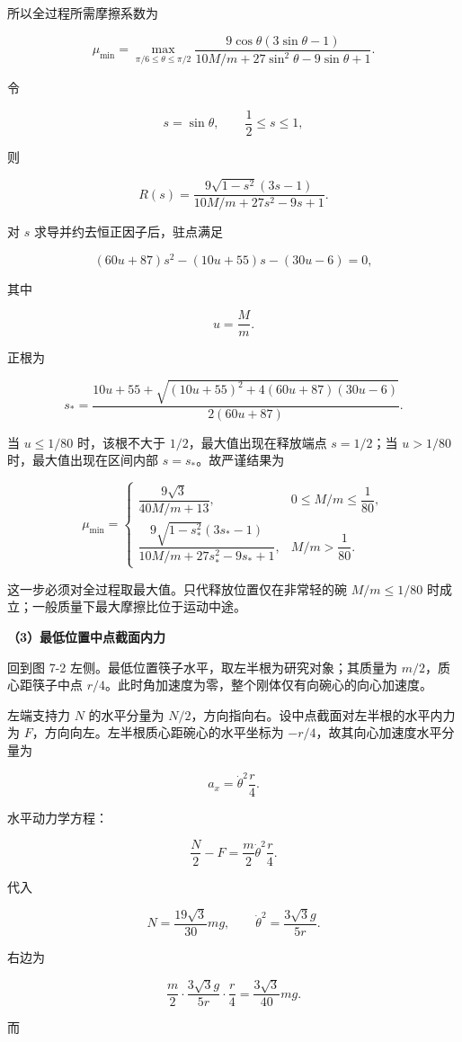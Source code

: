 \documentclass[12pt,a4paper,UTF8]{ctexart}
\begin{document}
所以全过程所需摩擦系数为

\[\mu_{\min}=\max_{\pi/6\le\theta\le\pi/2}
\frac{9\cos\theta(3\sin\theta-1)}
{10M/m+27\sin^2\theta-9\sin\theta+1}.\]

令

\[s=\sin\theta,\qquad \frac12\le s\le1,\]

则

\[R(s)=\frac{9\sqrt{1-s^2}(3s-1)}{10M/m+27s^2-9s+1}.\]

对 \(s\) 求导并约去恒正因子后，驻点满足

\[(60u+87)s^2-(10u+55)s-(30u-6)=0,\]

其中

\[u=\frac{M}{m}.\]

正根为

\[s_*=\frac{10u+55+\sqrt{(10u+55)^2+4(60u+87)(30u-6)}}{2(60u+87)}.\]

当 \(u\le1/80\) 时，该根不大于 \(1/2\)，最大值出现在释放端点
\(s=1/2\)；当 \(u>1/80\) 时，最大值出现在区间内部
\(s=s_*\)。故严谨结果为

\[\boxed{
\mu_{\min}=
\begin{cases}
\dfrac{9\sqrt3}{40M/m+13},&0\le M/m\le\dfrac1{80},\\[1.1em]
\dfrac{9\sqrt{1-s_*^2}(3s_*-1)}{10M/m+27s_*^2-9s_*+1},&M/m>\dfrac1{80}.
\end{cases}
}\]

这一步必须对全过程取最大值。只代释放位置仅在非常轻的碗 \(M/m\le1/80\)
时成立；一般质量下最大摩擦比位于运动中途。

\textbf{（3）最低位置中点截面内力}

回到图 7-2 左侧。最低位置筷子水平，取左半根为研究对象；其质量为
\(m/2\)，质心距筷子中点
\(r/4\)。此时角加速度为零，整个刚体仅有向碗心的向心加速度。

左端支持力 \(N\) 的水平分量为
\(N/2\)，方向指向右。设中点截面对左半根的水平内力为
\(F\)，方向向左。左半根质心距碗心的水平坐标为
\(-r/4\)，故其向心加速度水平分量为

\[a_x=\dot\theta^2\frac r4.\]

水平动力学方程：

\[\frac N2-F=\frac m2\dot\theta^2\frac r4.\]

代入

\[N=\frac{19\sqrt3}{30}mg,\qquad
\dot\theta^2=\frac{3\sqrt3g}{5r}.\]

右边为

\[\frac m2\cdot\frac{3\sqrt3g}{5r}\cdot\frac r4
=\frac{3\sqrt3}{40}mg.\]

而
\end{document}
